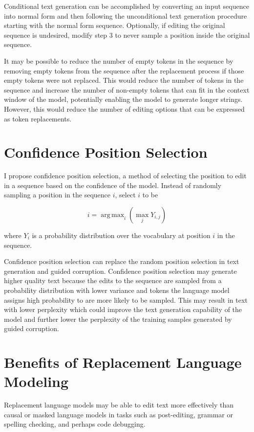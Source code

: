 \documentclass{article}
\DeclareMathOperator*{\argmax}{arg\,max}
\begin{document}
Conditional text generation can be accomplished by converting an input sequence into normal form and then following the unconditional text generation procedure starting with the normal form sequence. Optionally, if editing the original sequence is undesired, modify step 3 to never sample a position inside the original sequence.

It may be possible to reduce the number of empty tokens in the sequence by removing empty tokens from the sequence after the replacement process if those empty tokens were not replaced. This would reduce the number of tokens in the sequence and increase the number of non-empty tokens that can fit in the context window of the model, potentially enabling the model to generate longer strings. However, this would reduce the number of editing options that can be expressed as token replacements.


\section{Confidence Position Selection}
I propose confidence position selection, a method of selecting the position to edit in a sequence based on the confidence of the model. Instead of randomly sampling a position in the sequence $i$, select $i$ to be

\begin{equation}
    i = \argmax_{i} ( \max_{j} Y_{i,j} )
\end{equation}

where $Y_i$ is a probability distribution over the vocabulary at position $i$ in the sequence.

Confidence position selection can replace the random position selection in text generation and guided corruption. Confidence position selection may generate higher quality text because the edits to the sequence are sampled from a probability distribution with lower variance and tokens the language model assigns high probability to are more likely to be sampled. This may result in text with lower perplexity which could improve the text generation capability of the model and further lower the perplexity of the training samples generated by guided corruption.


\section{Benefits of Replacement Language Modeling}
Replacement language models may be able to edit text more effectively than causal or masked language models in tasks such as post-editing, grammar or spelling checking, and perhaps code debugging.
\end{document}
